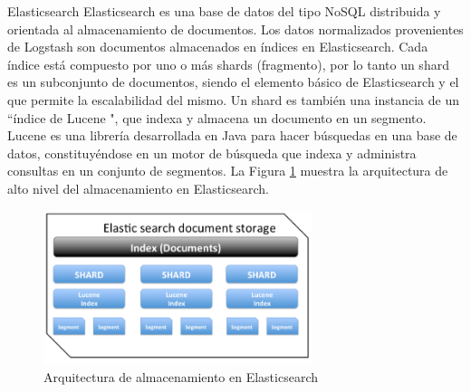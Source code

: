    \pagebreak
   \begin{subsubsection}{Elasticsearch}
        Elasticsearch es una base de datos del tipo NoSQL distribuida y orientada al almacenamiento de documentos. Los datos normalizados provenientes de Logstash son documentos almacenados en índices en Elasticsearch. Cada índice está compuesto por uno o más shards (fragmento), por lo tanto un shard es un subconjunto de documentos, siendo el elemento básico de Elasticsearch y el que permite la escalabilidad del mismo. Un shard es también una instancia de un “índice de Lucene \cite{lucene}", que indexa y almacena un documento en un segmento. Lucene es una librería desarrollada en Java para hacer búsquedas en una base de datos, constituyéndose en un motor de búsqueda que indexa y administra consultas en un conjunto de segmentos. La Figura \ref{fig:figura_21_arq_alm_elasticsearch} muestra la arquitectura de alto nivel del almacenamiento en Elasticsearch.
        
        \begin{figure}[H]
            \centering
            \includegraphics[width=0.7\textwidth]{./iteracion_1_imagenes/figura_21_arq_alm_elasticsearch.png}
            \caption{Arquitectura de almacenamiento en Elasticsearch}
            \label{fig:figura_21_arq_alm_elasticsearch}
        \end{figure}
    \end{subsubsection}

